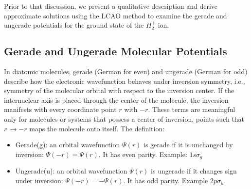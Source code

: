 Prior to that discussion, we present a qualitative description and derive approximate solutions using the LCAO method to examine the gerade and ungerade potentials for the ground state of the $H_{2}^{+}$ ion.
\subsection{Gerade and Ungerade Molecular Potentials}
In diatomic molecules, gerade (German for even) and ungerade (German for odd) describe how the electronic wavefunction behaves under inversion symmetry, i.e., symmetry of the molecular orbital with respect to the inversion center.
If the internuclear axis is placed through the center of the molecule, the inversion manifests with every coordinate point $ r $ with $ -r $.
These terms are meaningful only for molecules or systems that possess a center of inversion, points such that $ r\,\rightarrow -r $ maps the molecule onto itself.
The definition:
\begin{itemize}
  \item Gerade(g): an orbital wavefunction $ \Psi(r) $ is gerade if it is unchanged by inversion: $ \Psi(-r) = \Psi(r) $. It has even parity. Example: $ 1s\sigma_g $

  \item Ungerade(u): an orbital wavefunction $ \Psi(r) $ is ungerade if it changes sign under inversion: $ \Psi(-r) = -\Psi(r)  $. It has odd parity. Example $ 2p\sigma_u $.
\end{itemize}

